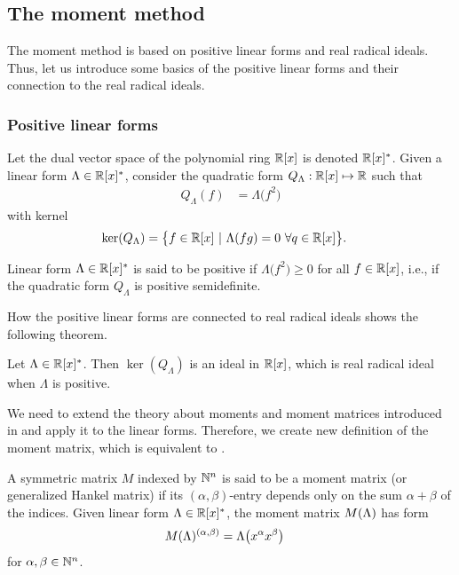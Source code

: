 \subsection{The moment method}
The moment method is based on positive linear forms and real radical ideals.
Thus, let us introduce some basics of the positive linear forms and their connection to the real radical ideals.

\subsubsection{Positive linear forms}
Let the dual vector space of the polynomial ring $\mathbb{R}[x]$ is denoted $\mathbb{R}[x]^*$.
Given a linear form $\Lambda\in\mathbb{R}[x]^*$, consider the quadratic form $Q_\Lambda : \mathbb{R}[x]\mapsto\mathbb{R}$ such that
\begin{align}
  Q_\Lambda(f) &= \Lambda\big(f^2\big)
\end{align}
with kernel
\begin{align}
  \operatorname{ker}(Q_\Lambda) &= \big\{f\in\mathbb{R}[x]\ |\ \Lambda(fg)=0\ \forall q\in\mathbb{R}[x]\big\}.
\end{align}

\begin{definition}[Positivity]
  Linear form $\Lambda\in\mathbb{R}[x]^*$ is said to be positive if $\Lambda\big(f^2\big) \geq 0$ for all $f\in\mathbb{R}[x]$, i.e., if the quadratic form $Q_\Lambda$ is positive semidefinite.
\end{definition}

How the positive linear forms are connected to real radical ideals shows the following theorem.

\begin{theorem}
  Let $\Lambda\in\mathbb{R}[x]^*$. Then $\ker(Q_\Lambda)$ is an ideal in $\mathbb{R}[x]$, which is real radical ideal when $\Lambda$ is positive.
\end{theorem}

We need to extend the theory about moments and moment matrices introduced in  and apply it to the linear forms. Therefore, we create new definition of the moment matrix, which is equivalent to .

\begin{definition}
  A symmetric matrix $M$ indexed by $\mathbb{N}^n$ is said to be a moment matrix (or generalized Hankel matrix) if its $(\alpha, \beta)$-entry depends only on the sum $\alpha + \beta$ of the indices.
  Given linear form $\Lambda\in\mathbb{R}[x]^*$, the moment matrix $M(\Lambda)$ has form
  \begin{align}
    M(\Lambda)^{(\alpha, \beta)} &= \Lambda\big(x^\alpha x^\beta\big)
  \end{align}
  for $\alpha, \beta \in\mathbb{N}^n$.
\end{definition}

